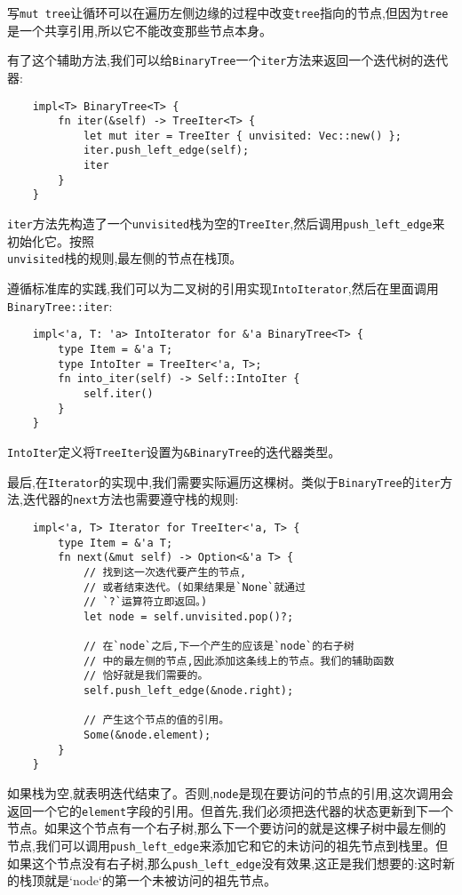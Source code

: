 写\texttt{mut tree}让循环可以在遍历左侧边缘的过程中改变\texttt{tree}指向的节点,但因为\texttt{tree}是一个共享引用,所以它不能改变那些节点本身。

有了这个辅助方法,我们可以给\texttt{BinaryTree}一个\texttt{iter}方法来返回一个迭代树的迭代器:
\begin{verbatim}
    impl<T> BinaryTree<T> {
        fn iter(&self) -> TreeIter<T> {
            let mut iter = TreeIter { unvisited: Vec::new() };
            iter.push_left_edge(self);
            iter
        }
    }
\end{verbatim}

\texttt{iter}方法先构造了一个\texttt{unvisited}栈为空的\texttt{TreeIter},然后调用\texttt{push\_left\_edge}来初始化它。按照\\
\texttt{unvisited}栈的规则,最左侧的节点在栈顶。

遵循标准库的实践,我们可以为二叉树的引用实现\texttt{IntoIterator},然后在里面调用\texttt{BinaryTree::iter}:
\begin{verbatim}
    impl<'a, T: 'a> IntoIterator for &'a BinaryTree<T> {
        type Item = &'a T;
        type IntoIter = TreeIter<'a, T>;
        fn into_iter(self) -> Self::IntoIter {
            self.iter()
        }
    }
\end{verbatim}

\texttt{IntoIter}定义将\texttt{TreeIter}设置为\texttt{\&BinaryTree}的迭代器类型。

最后,在\texttt{Iterator}的实现中,我们需要实际遍历这棵树。类似于\texttt{BinaryTree}的\texttt{iter}方法,迭代器的\texttt{next}方法也需要遵守栈的规则:
\begin{verbatim}
    impl<'a, T> Iterator for TreeIter<'a, T> {
        type Item = &'a T;
        fn next(&mut self) -> Option<&'a T> {
            // 找到这一次迭代要产生的节点,
            // 或者结束迭代。(如果结果是`None`就通过
            // `?`运算符立即返回。)
            let node = self.unvisited.pop()?;

            // 在`node`之后,下一个产生的应该是`node`的右子树
            // 中的最左侧的节点,因此添加这条线上的节点。我们的辅助函数
            // 恰好就是我们需要的。
            self.push_left_edge(&node.right);

            // 产生这个节点的值的引用。
            Some(&node.element);
        }
    }
\end{verbatim}

如果栈为空,就表明迭代结束了。否则,\texttt{node}是现在要访问的节点的引用,这次调用会返回一个它的\texttt{element}字段的引用。但首先,我们必须把迭代器的状态更新到下一个节点。如果这个节点有一个右子树,那么下一个要访问的就是这棵子树中最左侧的节点,我们可以调用\texttt{push\_left\_edge}来添加它和它的未访问的祖先节点到栈里。但如果这个节点没有右子树,那么\texttt{push\_left\_edge}没有效果,这正是我们想要的:这时新的栈顶就是`node`的第一个未被访问的祖先节点。

